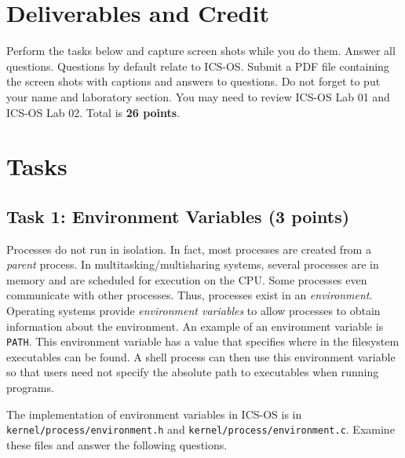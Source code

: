 \documentclass[a4paper, 11pt,oneside]{article}
\begin{document}
\section{Deliverables and Credit}
Perform the tasks below and capture screen shots while you do them. Answer
all questions. Questions by default relate to ICS-OS. Submit a PDF file containing the screen shots with captions 
and answers to questions. Do not forget to put your name and laboratory
section. You may need to review ICS-OS Lab 01 and ICS-OS Lab 02. Total is \textbf{26 points}.

\section{Tasks}

\subsection*{Task 1: Environment Variables (3 points)} 
Processes do not run in isolation. In fact, most processes are created from a \textit{parent} process. 
In multitasking/multisharing systems, several processes are in memory and are scheduled for execution 
on the CPU. Some processes even communicate with other processes. Thus, processes exist in an \textit{environment}. Operating systems provide \textit{environment variables} to allow processes to obtain information about the environment. An example of an environment variable is \texttt{PATH}. This 
environment variable has a value that specifies where in the filesystem executables 
can be found. A shell process can then use this environment variable so that users need not specify the absolute path to executables when running programs.

The implementation of environment variables in ICS-OS is in \texttt{kernel/process/environment.h} and 
\texttt{kernel/process/environment.c}. Examine these files and answer the following questions.



\noindent{}
\end{document}
